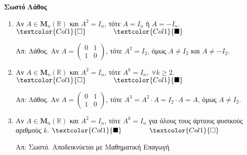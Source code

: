 



\pagestyle{askhseis}




\begin{center}
  \minibox{\large\bfseries \textcolor{Col2}{Πίνακες}}
\end{center}


\vspace{\baselineskip}

\hfill \textcolor{Col1}{\textbf{Σωστό}} \quad \textcolor{Col1}{\textbf{Λάθος}}
\begin{enumerate}[itemsep=.5\baselineskip]
  \item \textcolor{Col1}{Αν $ A \in \textbf{M}_{n}(\mathbb{R}) $ και $
      A^{2}=I_{n} $, τότε $ A=I_{n} $ ή $ A=-I_{n} $}. 
    \hfill $\textcolor{Col1}{\square} \qquad \qquad \textcolor{Col1}{\blacksquare}$

    Απ: Λάθος. Αν $ A= 
    \begin{pmatrix}
      0 & 1 \\
      1 & 0
    \end{pmatrix} $, τότε $ A^{2}=I_{2} $, όμως $ A \neq I_{2} $ και $ A \neq -I_{2} $.

  \item \textcolor{Col1}{Αν $ A \in \textbf{M}_{n}(\mathbb{R}) $ και $
      A^{2}=I_{n}
    $, τότε $ A^{k}=I_{n}, \; \forall k \geq 2 $}.
    \hfill $\textcolor{Col1}{\square} \qquad \qquad \textcolor{Col1}{\blacksquare}$

    Απ: Λάθος. Αν $ A= 
    \begin{pmatrix}
      0 & 1 \\
      1 & 0
    \end{pmatrix} $, τότε $ A^{3}= A^{2}\cdot A = I_{2} \cdot A = A $, 
    όμως $ A \neq I_{2} $.

  \item \textcolor{Col1}{Αν $ A \in \textbf{M}_{n}(\mathbb{R}) $ και $ A^{2}=I_{n} $, 
    τότε $ A^{k}=I_{n} $ για όλους τους άρτιους φυσικούς αριθμούς $k$}.
    \hfill $\textcolor{Col1}{\blacksquare} \qquad \qquad \textcolor{Col1}{\square}$

    Απ: Σωστό. Αποδεικνύεται με Μαθηματική Επαγωγή
\end{enumerate}






